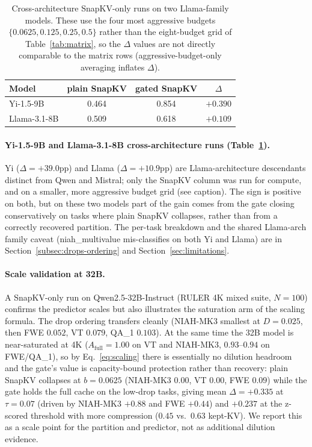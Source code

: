 \documentclass{article}
\begin{document}
\begin{table}[t]
\centering
\caption{Cross-architecture SnapKV-only runs on two Llama-family models.
These use the four most aggressive budgets $\{0.0625, 0.125, 0.25, 0.5\}$
rather than the eight-budget grid of Table~\ref{tab:matrix}, so the
$\Delta$ values are not directly comparable to the matrix rows
(aggressive-budget-only averaging inflates $\Delta$).}
\label{tab:crossarch}
\begin{tabular}{lccc}
\toprule
Model & plain SnapKV & gated SnapKV & $\Delta$ \\
\midrule
Yi-1.5-9B    & 0.464 & 0.854 & $+0.390$ \\
Llama-3.1-8B & 0.509 & 0.618 & $+0.109$ \\
\bottomrule
\end{tabular}
\end{table}

\paragraph{Yi-1.5-9B and Llama-3.1-8B cross-architecture runs
(Table~\ref{tab:crossarch}).} Yi
($\Delta = +39.0$pp) and Llama ($\Delta = +10.9$pp) are
Llama-architecture descendants distinct from Qwen and Mistral; only
the SnapKV column was run for compute, and on a smaller, more
aggressive budget grid (see caption). The sign is positive on both,
but on these two models part of the gain comes from the gate closing
conservatively on tasks where plain SnapKV collapses, rather than from
a correctly recovered partition. The per-task breakdown and the
shared Llama-arch family caveat (niah\_multivalue mis-classifies on
both Yi and Llama) are in Section~\ref{subsec:drops-ordering} and
Section~\ref{sec:limitations}.

\paragraph{Scale validation at 32B.} A SnapKV-only run on
Qwen2.5-32B-Instruct (RULER 4K mixed suite, $N = 100$) confirms the
predictor scales but also illustrates the saturation arm of the scaling
formula. The drop ordering transfers cleanly (NIAH-MK3 smallest at
$D = 0.025$, then FWE $0.052$, VT $0.079$, QA\_1 $0.103$). At the same
time the 32B model is near-saturated at 4K ($A_{\mathrm{full}} = 1.00$
on VT and NIAH-MK3, $0.93$--$0.94$ on FWE/QA\_1), so by
Eq.~\eqref{eq:scaling} there is essentially no dilution headroom and the
gate's value is capacity-bound protection rather than recovery: plain
SnapKV collapses at $b = 0.0625$ (NIAH-MK3 $0.00$, VT $0.00$, FWE
$0.09$) while the gate holds the full cache on the low-drop tasks,
giving mean $\Delta = +0.335$ at $\tau = 0.07$ (driven by NIAH-MK3
$+0.88$ and FWE $+0.44$) and $+0.237$ at the z-scored threshold with
more compression ($0.45$ vs.\ $0.63$ kept-KV). We report this as a
scale point for the partition and predictor, not as additional dilution
evidence.
\end{document}
